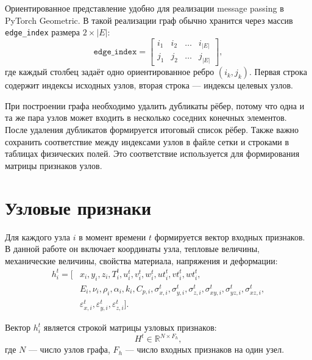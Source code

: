 Ориентированное представление удобно для реализации message passing в PyTorch Geometric. В такой реализации граф обычно хранится через массив \texttt{edge\_index} размера $2 \times |E|$:
\begin{equation}
    \texttt{edge\_index}=\begin{bmatrix}
    i_1 & i_2 & \dots & i_{|E|} \\
    j_1 & j_2 & \dots & j_{|E|}
    \end{bmatrix},
\end{equation}
где каждый столбец задаёт одно ориентированное ребро $(i_k,j_k)$. Первая строка содержит индексы исходных узлов, вторая строка --- индексы целевых узлов.

При построении графа необходимо удалить дубликаты рёбер, потому что одна и та же пара узлов может входить в несколько соседних конечных элементов. После удаления дубликатов формируется итоговый список рёбер. Также важно сохранить соответствие между индексами узлов в файле сетки и строками в таблицах физических полей. Это соответствие используется для формирования матрицы признаков узлов.

\section{Узловые признаки}

Для каждого узла $i$ в момент времени $t$ формируется вектор входных признаков. В данной работе он включает координаты узла, тепловые величины, механические величины, свойства материала, напряжения и деформации:
\begin{equation}
\begin{split}
    h_i^t = [&x_i, y_i, z_i,
    T_i^t,
    u_i^t, v_i^t, w_i^t,
    ut_i^t, vt_i^t, wt_i^t,\\
    &E_i, \nu_i, \rho_i, \alpha_i, k_i, C_{p,i},
    \sigma_{x,i}^t, \sigma_{y,i}^t, \sigma_{z,i}^t,
    \sigma_{xy,i}^t, \sigma_{yz,i}^t, \sigma_{xz,i}^t,\\
    &\varepsilon_{x,i}^t, \varepsilon_{y,i}^t, \varepsilon_{z,i}^t].
\end{split}
\end{equation}

Вектор $h_i^t$ является строкой матрицы узловых признаков:
\begin{equation}
    H^t \in \mathbb{R}^{N \times F_h},
\end{equation}
где $N$ --- число узлов графа, $F_h$ --- число входных признаков на один узел.

